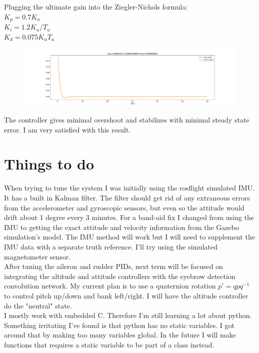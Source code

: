 \documentclass[11pt]{scrartcl} %
\begin{document}
Plugging the ultimate gain into the Ziegler-Nichols formula:
\\
$K_p = 0.7K_u$
\\
$K_i = 1.2K_u/T_u$
\\
$K_d = 0.075K_uT_u$

\begin{figure}[ht!] %
	\centering
	\includegraphics[trim={5cm 0 5cm 0},clip,width=\textwidth]{PIDfinal.pdf} 
\end{figure}

The controller gives minimal overshoot and stabilizes with minimal steady state error. I am very satisfied with this result.
\clearpage

\section{Things to do}
When trying to tune the system I was initially using the rosflight simulated IMU. It has a built in Kalman filter. The filter should get rid of any extraneous errors from the accelerometer and gyroscopic sensors, but even so the attitude would drift about 1 degree every 3 minutes. For a band-aid fix I changed from using the IMU to getting the exact attitude and velocity information from the Gazebo simulation's model. The IMU method will work but I will need to supplement the IMU data with a separate truth reference. I'll try using the simulated magnetometer sensor.\\

After tuning the aileron and rudder PIDs, next term will be focused on integrating the altitude and attitude controllers with the eyebrow detection convolution network. My current plan is to use a quaternion rotation $p'=qpq^{-1}$ to control pitch up/down and bank left/right. I will have the altitude controller do the "neutral" state. \\

I mostly work with embedded C. Therefore I'm still learning a lot about python. Something irritating I've found is that python has no static variables. I got around that by making too many variables global. In the future I will make functions that requires a static variable to be part of a class instead.
\end{document}
